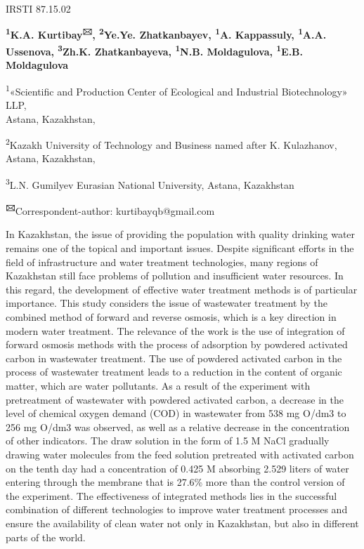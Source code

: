 \newpage
IRSTI 87.15.02


\begin{center}
{\bfseries \textsuperscript{1}K.A. Kurtibay\textsuperscript{🖂}, \textsuperscript{2}Ye.Ye. Zhatkanbayev, \textsuperscript{1}A. Kappassuly, \textsuperscript{1}A.A. Ussenova, \textsuperscript{3}Zh.K. Zhatkanbayeva, \textsuperscript{1}N.B. Moldagulova, \textsuperscript{1}E.B. Moldagulova}

\textsuperscript{1}«Scientific and Production Center of Ecological and
Industrial Biotechnology» LLP,\\
Astana, Kazakhstan,

\textsuperscript{2}Kazakh University of Technology and Business named
after K. Kulazhanov,\\
Astana, Kazakhstan,

\textsuperscript{3}L.N. Gumilyev Eurasian National University, Astana,
Kazakhstan

{\bfseries \textsuperscript{🖂}}Correspondent-author: kurtibayqb@gmail.com
\end{center}

In Kazakhstan, the issue of providing the population with quality
drinking water remains one of the topical and important issues. Despite
significant efforts in the field of infrastructure and water treatment
technologies, many regions of Kazakhstan still face problems of
pollution and insufficient water resources. In this regard, the
development of effective water treatment methods is of particular
importance. This study considers the issue of wastewater treatment by
the combined method of forward and reverse osmosis, which is a key
direction in modern water treatment. The relevance of the work is the
use of integration of forward osmosis methods with the process of
adsorption by powdered activated carbon in wastewater treatment. The use
of powdered activated carbon in the process of wastewater treatment
leads to a reduction in the content of organic matter, which are water
pollutants. As a result of the experiment with pretreatment of
wastewater with powdered activated carbon, a decrease in the level of
chemical oxygen demand (COD) in wastewater from 538 mg O/dm3 to 256 mg
O/dm3 was observed, as well as a relative decrease in the concentration
of other indicators. The draw solution in the form of 1.5 M NaCl
gradually drawing water molecules from the feed solution pretreated with
activated carbon on the tenth day had a concentration of 0.425 M
absorbing 2.529 liters of water entering through the membrane that is
27.6\% more than the control version of the experiment. The
effectiveness of integrated methods lies in the successful combination
of different technologies to improve water treatment processes and
ensure the availability of clean water not only in Kazakhstan, but also
in different parts of the world.

